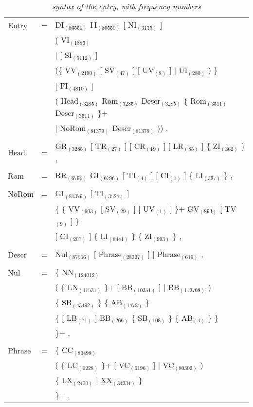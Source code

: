 \begin{table}[htb]
\centering
\begin{tabular}{lcl}
 Entry  &=& DI$_{(86550)}$ I\,I$_{(86550)}$ [ NI$_{(3135)}$ ]\\
        & & ( VI$_{(1886)}$\\
        & & $|$ [ SI$_{(5112)}$ ]\\
        & & \hspace{2mm} (\{ VV$_{(2190)}$ [ SV$_{(47)}$ ] [ UV$_{(8)}$ ] $|$ UI$_{(280)}$ ) \} \\
        & & \hspace{2mm} [ FI$_{(4810)}$ ]\\
        & & \hspace{2mm} ( Head$_{(3285)}$ Rom$_{(3285)}$ Descr$_{(3285)}$ \{ Rom$_{(3511)}$ Descr$_{(3511)}$ \}+ \\
        & & \hspace{2mm} $|$ NoRom$_{(81379)}$ Descr$_{(81379)}$ )) ,\\ \\
 Head   &=& GR$_{(3285)}$ [ TR$_{(27)}$ ] [ CR$_{(19)}$ ] [ LR$_{(85)}$ ] \{ ZI$_{(362)}$ \} , \\ \\
 Rom    &=& RR$_{(6796)}$ GI$_{(6796)}$ [ TI$_{(4)}$ ] [ CI$_{(1)}$ ] \{ LI$_{(327)}$ \} ,\\ \\
 NoRom  &=& GI$_{(81379)}$ [ TI$_{(3524)}$ ]\\
        & & \{ \{ VV$_{(903)}$ [ SV$_{(29)}$ ] [ UV$_{(1)}$ ] \}+ GV$_{(893)}$ [ TV$_{(9)}$ ] \}\\
        & & [ CI$_{(207)}$ ] \{ LI$_{(8441)}$ \} \{ ZI$_{(993)}$ \} ,\\ \\
 Descr  &=& Nul$_{(87556)}$ [ Phrase$_{(28327)}$ ] $|$ Phrase$_{(619)}$ ,\\ \\
 Nul    &=& \{ NN$_{(124012)}$\\
        & & \hspace{2mm} ( \{ LN$_{(11531)}$ \}+ [ BB$_{(10351)}$ ] $|$ BB$_{(112708)}$ )\\
        & & \hspace{2mm} \{ SB$_{(43492)}$ \} \{ AB$_{(1478)}$ \} \\
        & & \hspace{2mm} \{ [ LB$_{(71)}$ ] BB$_{(266)}$ \{ SB$_{(108)}$ \} \{ AB$_{(4)}$ \} \} \\
        & & \}+ ,\\ \\
 Phrase &=& \{ CC$_{(86498)}$\\
        & & \hspace{2mm} ( \{ LC$_{(6228)}$ \}+ [ VC$_{(6196)}$ ] $|$ VC$_{(80302)}$ ) \\
        & & \hspace{2mm} \{ LX$_{(2400)}$ $|$ XX$_{(31234)}$ \} \\
        & & \}+ . \\
\end{tabular}
\caption{{\em syntax of the entry, with frequency numbers}}
\end{table}

